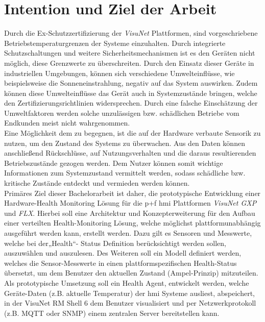 \section{Intention und Ziel der Arbeit}\label{sec:IZA}
Durch die Ex-Schutzzertifizierung der \textit{VisuNet} Plattformen, sind vorgeschriebene Betriebstemperaturgrenzen der Systeme einzuhalten. Durch integrierte Schutzschaltungen und weitere Sicherheitsmechanismen ist es den Geräten nicht möglich, diese Grenzwerte zu überschreiten. Durch den Einsatz dieser Geräte in industriellen Umgebungen, können sich verschiedene Umwelteinflüsse, wie beispielsweise die Sonneneinstrahlung, negativ auf das System auswirken. Zudem können diese Umwelteinflüsse das Gerät auch in Systemzustände bringen, welche den Zertifizierungsrichtlinien widersprechen. Durch eine falsche Einschätzung der Umweltfaktoren werden solche unzulässigen bzw. schädlichen Betriebe vom Endkunden meist nicht wahrgenommen.\\
Eine Möglichkeit dem zu begegnen, ist die auf  der Hardware verbaute Sensorik zu nutzen, um den Zustand des Systems zu überwachen. Aus den Daten können anschließend Rückschlüsse, auf Nutzungsverhalten und die daraus resultierenden Betriebszustände gezogen werden. Dem Nutzer können somit wichtige Informationen zum Systemzustand vermittelt werden, sodass schädliche bzw. kritische Zustände entdeckt und vermieden werden können.\\
Primäres Ziel dieser Bachelorarbeit ist daher, die prototypische Entwicklung einer Hardware-Health Monitoring Lösung für die \acl{p+f} \ac{hmi} Plattformen \textit{VisuNet GXP} und \textit{FLX}. Hierbei soll eine Architektur und Konzepterweiterung für den Aufbau einer verteilten Health-Monitoring Lösung, welche möglichst plattformunabhängig ausgeführt werden kann, erstellt werden. Dazu gilt es Sensoren und Messwerte, welche bei der„Health“- Status Definition berücksichtigt werden sollen, auszuwählen und auszulesen. Des Weiteren soll ein Modell definiert werden, welches die Sensor-Messwerte in einen plattformspezifischen Health-Status übersetzt, um dem Benutzer den aktuellen Zustand (Ampel-Prinzip) mitzuteilen. Als prototypische Umsetzung soll ein Health Agent, entwickelt werden, welche Geräte-Daten (z.B. aktuelle Temperatur) der \ac{hmi} Systeme ausliest, abspeichert, in der VisuNet RM Shell 6 dem Benutzer visualisiert und per Netzwerkprotokoll (z.B. MQTT oder SNMP) einem zentralen Server bereitstellen kann.    

